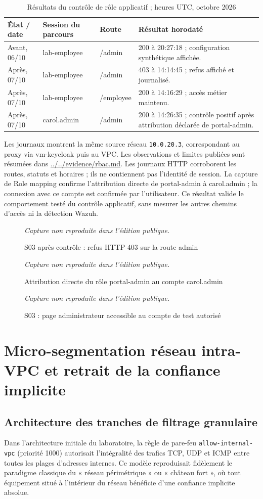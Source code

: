 \documentclass[a4paper,12pt]{report}
\newcommand{\publiccapture}[1]{%
  \begin{figure}[H]\centering
  {\footnotesize\itshape Capture non reproduite dans l'édition publique.}
  \caption{#1}\end{figure}}
\begin{document}
\begin{table}[H]\centering\small
\caption{Résultats du contrôle de rôle applicatif ; heures UTC, octobre 2026}
\begin{tabularx}{\textwidth}{p{2.2cm}p{3cm}p{2cm}Y}\toprule
\textbf{État / date} & \textbf{Session du parcours} & \textbf{Route} & \textbf{Résultat horodaté}\\\midrule
Avant, 06/10 & lab-employee & /admin & 200 à 20:27:18 ; configuration synthétique affichée.\\
Après, 07/10 & lab-employee & /admin & 403 à 14:14:45 ; refus affiché et journalisé.\\
Après, 07/10 & lab-employee & /employee & 200 à 14:16:29 ; accès métier maintenu.\\
Après, 07/10 & carol.admin & /admin & 200 à 14:26:35 ; contrôle positif après attribution déclarée de portal-admin.\\\bottomrule
\end{tabularx}\end{table}

Les journaux montrent la même source réseau \texttt{10.0.20.3}, correspondant au proxy via vm-keycloak puis au VPC. Les observations et limites publiées sont résumées dans \url{../../evidence/rbac.md}. Les journaux HTTP corroborent les routes, statuts et horaires ; ils ne contiennent pas l'identité de session. La capture de Role mapping confirme l'attribution directe de portal-admin à carol.admin ; la connexion avec ce compte est confirmée par l'utilisateur. Ce résultat valide le comportement testé du contrôle applicatif, sans mesurer les autres chemins d'accès ni la détection Wazuh.

\publiccapture{S03 après contrôle : refus HTTP 403 sur la route admin}
\publiccapture{Attribution directe du rôle portal-admin au compte carol.admin}
\publiccapture{S03 : page administrateur accessible au compte de test autorisé}

\section{Micro-segmentation réseau intra-VPC et retrait de la confiance implicite}
\label{sec:p4-network}
\subsection{Architecture des tranches de filtrage granulaire}
Dans l'architecture initiale du laboratoire, la règle de pare-feu \texttt{allow-internal-vpc} (priorité 1000) autorisait l'intégralité des trafics TCP, UDP et ICMP entre toutes les plages d'adresses internes. Ce modèle reproduisait fidèlement le paradigme classique du « réseau périmétrique » ou « château fort », où tout équipement situé à l'intérieur du réseau bénéficie d'une confiance implicite absolue.
\end{document}
